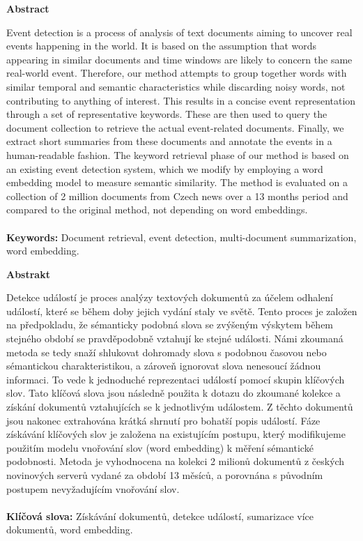 \thispagestyle{plain}

\begin{center}
	\Large
	\textbf{Abstract}
\end{center}

Event detection is a process of analysis of text documents aiming to uncover real events happening in the world. It is based on the assumption that words appearing in similar documents and time windows are likely to concern the same real-world event. Therefore, our method attempts to group together words with similar temporal and semantic characteristics while discarding noisy words, not contributing to anything of interest. This results in a concise event representation through a set of representative keywords. These are then used to query the document collection to retrieve the actual event-related documents. Finally, we extract short summaries from these documents and annotate the events in a human-readable fashion. The keyword retrieval phase of our method is based on an existing event detection system, which we modify by employing a word embedding model to measure semantic similarity. The method is evaluated on a collection of 2 million documents from Czech news over a 13 months period and compared to the original method, not depending on word embeddings.
\\
\\
\textbf{Keywords:} Document retrieval, event detection, multi-document summarization, word embedding.

\hfill

\begin{center}
	\Large
	\textbf{Abstrakt}
\end{center}

Detekce událostí je proces analýzy textových dokumentů za účelem odhalení událostí, které se během doby jejich vydání staly ve světě. Tento proces je založen na předpokladu, že sémanticky podobná slova se zvýšeným výskytem během stejného období se pravděpodobně vztahují ke stejné události. Námi zkoumaná metoda se tedy snaží shlukovat dohromady slova s podobnou časovou nebo sémantickou charakteristikou, a zároveň ignorovat slova nenesoucí žádnou informaci. To vede k jednoduché reprezentaci událostí pomocí skupin klíčových slov. Tato klíčová slova jsou následně použita k dotazu do zkoumané kolekce a získání dokumentů vztahujících se k jednotlivým událostem. Z těchto dokumentů jsou nakonec extrahována krátká shrnutí pro bohatší popis událostí. Fáze získávání klíčových slov je založena na existujícím postupu, který modifikujeme použitím modelu vnořování slov (word embedding) k měření sémantické podobnosti. Metoda je vyhodnocena na kolekci 2 milionů dokumentů z českých novinových serverů vydané za období 13 měsíců, a porovnána s původním postupem nevyžadujícím vnořování slov.
\\
\\
\textbf{Klíčová slova:} Získávání dokumentů, detekce událostí, sumarizace více dokumentů, word embedding.
